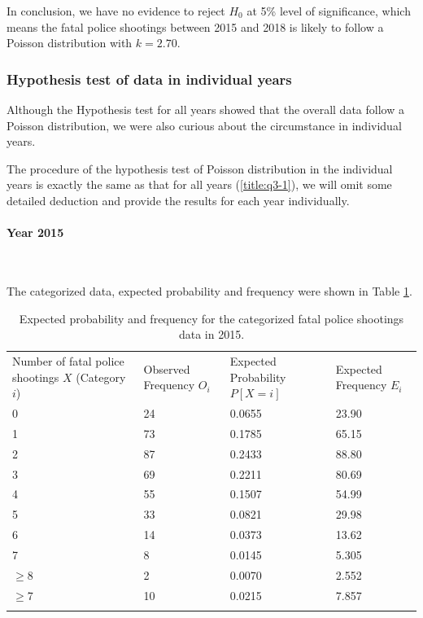 \documentclass[conf]{new-aiaa}
\begin{document}
In conclusion, we have no evidence to reject $H_0$ at 5\% level of significance, which means the fatal police shootings between 2015 and 2018 is likely to follow a Poisson distribution with $k=2.70.$

\subsubsection{Hypothesis test of data in individual years}

Although the Hypothesis test for all years showed that the overall data follow a Poisson distribution, we were also curious about the circumstance in individual years. \medskip

The procedure of the hypothesis test of Poisson distribution in the individual years is exactly the same as that for all years (\ref{title:q3-1}), we will omit some detailed deduction and provide the results for each year individually.

\paragraph{Year 2015}\ 

The categorized data, expected probability and frequency were shown in Table \ref{tab:q3-2015-exp}. \medskip

\begin{table}[!htbp]
\centering
\begin{tabular}{m{3cm}<{\centering}m{3cm}<{\centering}m{3cm}<{\centering}m{3cm}<{\centering}}
\toprule 
\toprule
Number of fatal police shootings $X$ (Category $i$)
 & Observed Frequency $O_i$ 
& Expected Probability $P[X=i]$ & Expected Frequency $E_i$ \\
\noalign{\smallskip}\hline\noalign{\smallskip}
0  &   24   & 0.0655  & 23.90\\
1  &   73   & 0.1785   & 65.15\\
2  &   87   & 0.2433   & 88.80\\
3  &   69   & 0.2211   & 80.69\\
4  &   55   & 0.1507   & 54.99\\
5  &   33   & 0.0821  & 29.98\\
6  &   14   & 0.0373  & 13.62\\
7  &   8    & 0.0145  & 5.305\\
$\geqslant$8  &   2    & 0.0070  & 2.552\\\hline
$\geqslant$7  &   10    & 0.0215  & 7.857\\
\bottomrule 
\bottomrule  \smallskip
\end{tabular}
\caption{Expected probability and frequency for the categorized fatal police shootings data in 2015.}
\label{tab:q3-2015-exp}
\end{table}
\end{document}
